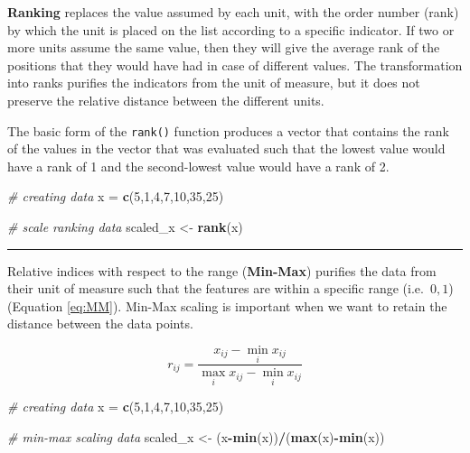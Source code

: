 \documentclass[
]{article}
\newenvironment{Shaded}{\begin{snugshade}}{\end{snugshade}}
\newcommand{\CommentTok}[1]{\textcolor[rgb]{0.56,0.35,0.01}{\textit{#1}}}
\newcommand{\DecValTok}[1]{\textcolor[rgb]{0.00,0.00,0.81}{#1}}
\newcommand{\FunctionTok}[1]{\textcolor[rgb]{0.13,0.29,0.53}{\textbf{#1}}}
\newcommand{\NormalTok}[1]{#1}
\newcommand{\OtherTok}[1]{\textcolor[rgb]{0.56,0.35,0.01}{#1}}
\newcommand{\SpecialCharTok}[1]{\textcolor[rgb]{0.81,0.36,0.00}{\textbf{#1}}}
\begin{document}
\textbf{Ranking} replaces the value assumed by each unit, with the order
number (rank) by which the unit is placed on the list according to a
specific indicator. If two or more units assume the same value, then
they will give the average rank of the positions that they would have
had in case of different values. The transformation into ranks purifies
the indicators from the unit of measure, but it does not preserve the
relative distance between the different units.

The basic form of the \texttt{rank()} function produces a vector that contains
the rank of the values in the vector that was evaluated such that the
lowest value would have a rank of 1 and the second-lowest value would
have a rank of 2.

\begin{Shaded}
\begin{Highlighting}[]
\CommentTok{\# creating data}
\NormalTok{x }\OtherTok{=} \FunctionTok{c}\NormalTok{(}\DecValTok{5}\NormalTok{,}\DecValTok{1}\NormalTok{,}\DecValTok{4}\NormalTok{,}\DecValTok{7}\NormalTok{,}\DecValTok{10}\NormalTok{,}\DecValTok{35}\NormalTok{,}\DecValTok{25}\NormalTok{)}

\CommentTok{\# scale ranking data}
\NormalTok{scaled\_x }\OtherTok{\textless{}{-}} \FunctionTok{rank}\NormalTok{(x)}
\end{Highlighting}
\end{Shaded}

\begin{center}\rule{0.5\linewidth}{0.5pt}\end{center}

Relative indices with respect to the range (\textbf{Min-Max}) purifies the
data from their unit of measure such that the features are within a
specific range (i.e.~\(0, 1\))(Equation \eqref{eq:MM}). Min-Max scaling is important when we want
to retain the distance between the data points.

\begin{equation}
r_{ij}=\frac{x_{ij}-\min_ix_{ij}}{\max_ix_{ij}-\min_ix_{ij}}
\label{eq:MM}
\end{equation}

\begin{Shaded}
\begin{Highlighting}[]
\CommentTok{\# creating data}
\NormalTok{x }\OtherTok{=} \FunctionTok{c}\NormalTok{(}\DecValTok{5}\NormalTok{,}\DecValTok{1}\NormalTok{,}\DecValTok{4}\NormalTok{,}\DecValTok{7}\NormalTok{,}\DecValTok{10}\NormalTok{,}\DecValTok{35}\NormalTok{,}\DecValTok{25}\NormalTok{)}

\CommentTok{\# min{-}max scaling data}
\NormalTok{scaled\_x }\OtherTok{\textless{}{-}}\NormalTok{ (x}\SpecialCharTok{{-}}\FunctionTok{min}\NormalTok{(x))}\SpecialCharTok{/}\NormalTok{(}\FunctionTok{max}\NormalTok{(x)}\SpecialCharTok{{-}}\FunctionTok{min}\NormalTok{(x))}
\end{Highlighting}
\end{Shaded}
\end{document}
